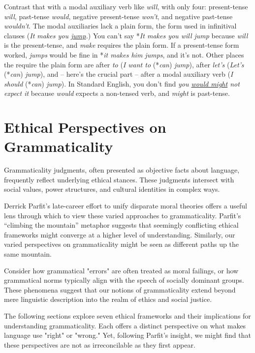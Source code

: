 Contrast that with a modal auxiliary verb like \textit{will}, with only four: present-tense \textit{will}, past-tense \textit{would}, negative present-tense \textit{won't}, and negative past-tense \textit{wouldn't}. The modal auxiliaries lack a plain form, the form used in infinitival clauses (\textit{It makes you \uline{jump}.}) You can't say *\textit{It makes you will jump} because \textit{will} is the present-tense, and \textit{make} requires the plain form. If a present-tense form worked, \textit{jumps} would be fine in *\textit{it makes him jumps}, and it's not. Other places the require the plain form are after \textit{to} (\textit{I want to }(*\textit{can})\textit{ jump}), after \textit{let's} (\textit{Let's }(*\textit{can})\textit{ jump}), and -- here's the crucial part -- after a modal auxiliary verb (\textit{I should }(*\textit{can})\textit{ jump}). In Standard English, you don't find \textit{you \uline{would might} not expect it} because \textit{would} expects a non-tensed verb, and \textit{might} is past-tense.

\section{Ethical Perspectives on Grammaticality}

Grammaticality judgments, often presented as objective facts about language, frequently reflect underlying ethical stances. These judgments intersect with social values, power structures, and cultural identities in complex ways.

Derrick Parfit's late-career effort to unify disparate moral theories offers a useful lens through which to view these varied approaches to grammaticality. Parfit's ``climbing the mountain'' metaphor suggests that seemingly conflicting ethical frameworks might converge at a higher level of understanding. Similarly, our varied perspectives on grammaticality might be seen as different paths up the same mountain.

Consider how grammatical "errors" are often treated as moral failings, or how grammatical norms typically align with the speech of socially dominant groups. These phenomena suggest that our notions of grammaticality extend beyond mere linguistic description into the realm of ethics and social justice.

The following sections explore seven ethical frameworks and their implications for understanding grammaticality. Each offers a distinct perspective on what makes language use "right" or "wrong." Yet, following Parfit's insight, we might find that these perspectives are not as irreconcilable as they first appear.

